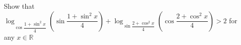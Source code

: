 Show that $\log_{\cos\dfrac{1+\sin^2x}{4}}\left(\sin\dfrac{1+\sin^2x}{4}\right)+\log_{\sin\dfrac{2+\cos^2x}{4}}\left(\cos\dfrac{2+\cos^2x}{4}\right)> 2$ for any $x\in \mathbb{R}$
